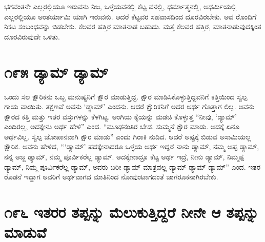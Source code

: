 ಭಗವಂತನೇ ಎಲ್ಲರಲ್ಲಿಯೂ ಇರುವನು ನಿಜ, ಒಳ್ಳೆಯವನಲ್ಲಿ ಕೆಟ್ಟ ವನಲ್ಲಿ, ಧರ್ಮಾತ್ಮನಲ್ಲಿ, ಅಧರ್ಮಿಯಲ್ಲಿ ಎಲ್ಲರಲ್ಲಿಯೂ ಅಂತರ್ಯಾಮಿ ಯಾಗಿ ಇರುವನು. ಆದರೆ ಕೆಟ್ಟವರ ಸಹವಾಸದಿಂದ ದೂರವಿರಬೇಕು. ಅವ ರೊಂದಿಗೆ ನಿಕಟ ಸಂಬಂಧವನ್ನು ಬಿಡಬೇಕು. ಕೆಲವರ ಹತ್ತಿರ ಮಾತನಾಡ ಬಹುದು. ಮತ್ತೆ ಕೆಲವರ ಹತ್ತಿರ, ಮಾತನಾಡುವುದಕ್ಕಿಂತ ದೂರವಿರುವುದೇ ಒಳಿತು.


\section{\num{೧೯೫ } ಡ್ಯಾಮ್ ಡ್ಯಾಮ್​}

ಒಂದು ಸಲ ಕ್ಷೌರಿಕನು ಒಬ್ಬ ಮನುಷ್ಯನಿಗೆ ಕ್ಷೌರ ಮಾಡುತ್ತಿದ್ದ. ಕ್ಷೌರ ಮಾಡಿಸಿಕೊಳ್ಳುತ್ತಿದ್ದವನಿಗೆ ಕತ್ತಿಯಿಂದ ಸ್ವಲ್ಪ ಗಾಯ ವಾಯಿತು. ತಕ್ಷಣವೆ ಅವನು ‘ಡ್ಯಾಮ್​’ ಎಂದನು. ಆದರೆ ಕ್ಷೌರಿಕನಿಗೆ ಅದರ ಅರ್ಥ ಗೊತ್ತಾಗ ಲಿಲ್ಲ. ಅವನು ಕ್ಷೌರದ ಕತ್ತಿ ಮತ್ತು ಇತರ ವಸ್ತುಗಳನ್ನು ಕೆಳಗಿಟ್ಟ. ಅಂಗಿಯ ಕೈಯನ್ನು ಮಡಚಿ ಕೊಳ್ಳುತ್ತ “ನೀವು, ‘ಡ್ಯಾಮ್​’ ಎಂದಿರಲ್ಲ, ಅದಕ್ಕೇನು ಅರ್ಥ ಹೇಳಿ” ಎಂದ. “ಮೂಢನಂತಿರ ಬೇಡ. ಸುಮ್ಮನೆ ಕ್ಷೌರ ಮಾಡು. ಅದಕ್ಕೆ ಏನೂ ಅರ್ಥವಿಲ್ಲ. ಸ್ವಲ್ಪ ಜೋಪಾನವಾಗಿ ಕ್ಷೌರ ಮಾಡು” ಎಂದು ಗಿರಾಕಿ ನುಡಿದ. ಆದರೆ ಅಷ್ಟಕ್ಕೆ ಬಿಡುವ ಅಸಾಮಿಯಲ್ಲ ಕ್ಷೌರಿಕ. ಅವನು ಹೇಳಿದ, “‘ಡ್ಯಾಮ್​’ ಪದಕ್ಕೇನಾದರೂ ಒಳ್ಳೆಯ ಅರ್ಥ ಇದ್ದರೆ ನಾನು ಡ್ಯಾಮ್, ನಮ್ಮ ಅಪ್ಪ ಡ್ಯಾಮ್, ನನ್ನ ಅಜ್ಜ ಡ್ಯಾಮ್, ನಮ್ಮ ಪೂರ್ವಿಕರೆಲ್ಲ ಡ್ಯಾಮ್. ಅದಕ್ಕೇನಾದ್ರೂ ಕೆಟ್ಟ ಅರ್ಥ ಇದ್ರೆ, ನೀನು ಡ್ಯಾಮ್, ನಿಮ್ಮಪ್ಪ ಡ್ಯಾಮ್, ನಿಮ್ಮ ಪೂರ್ವಿಕರೆಲ್ಲ ಡ್ಯಾಮ್, ಅವರು ಬರೀ ಡ್ಯಾಮ್ ಮಾತ್ರವಲ್ಲ ಡ್ಯಾಮ್ ಡ್ಯಾಮ್ ಡ್ಯಾಮ್​” ಎಂದ. ಇತರ ರೊಡನೆ ಇದ್ದಾಗ ಅವರಿಗೆ ಅರ್ಥವಾಗದ ಮಾತಿನಿಂದ ನೋವುಂಟಾಗದಂತೆ ಜಾಗರೂಕನಾಗಿರಬೇಕು.


\section{\num{೧೯೬ } ಇತರರ ತಪ್ಪನ್ನು ಮೆಲುಕುತ್ತಿದ್ದರೆ ನೀನೇ ಆ ತಪ್ಪನ್ನು ಮಾಡುವೆ}

